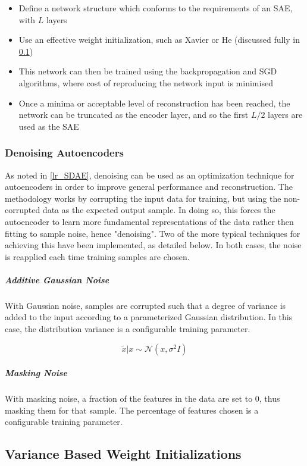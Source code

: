 \documentclass[a4paper,11pt,oneside]{article}
\theoremstyle{plain}
\theoremstyle{definition}
\begin{document}
\begin{itemize}
	\item [1] Define a network structure which conforms to the requirements of an SAE, with $L$ layers
	\item [2] Use an effective weight initialization, such as Xavier or He (discussed fully in \ref{imp_weights})
	\item [3] This network can then be trained using the backpropagation and SGD algorithms, where cost of reproducing the network input is minimised
	\item [4] Once a minima or acceptable level of reconstruction has been reached, the network can be truncated as the encoder layer, and so the first $L/2$ layers are used as the SAE
\end{itemize}

\subsubsection{Denoising Autoencoders}

As noted in \ref{lr_SDAE}, denoising can be used as an optimization technique for autoencoders in order to improve general performance and reconstruction. The methodology works by corrupting the input data for training, but using the non-corrupted data as the expected output sample. In doing so, this forces the autoencoder to learn more fundamental representations of the data rather then fitting to sample noise, hence "denoising". Two of the more typical techniques for achieving this have been implemented, as detailed below. In both cases, the noise is reapplied each time training samples are chosen.

\subparagraph{Additive Gaussian Noise}

With Gaussian noise, samples are corrupted such that a degree of variance is added to the input according to a parameterized Gaussian distribution. In this case, the distribution variance is a configurable training parameter.

\begin{equation}
\tilde{{x}} | {x} \sim \mathcal{N}\left({x}, \sigma^{2} I\right)
\end{equation}

\subparagraph{Masking Noise}

With masking noise, a fraction of the features in the data are set to 0, thus masking them for that sample. The percentage of features chosen is a configurable training parameter.

\subsection{Variance Based Weight Initializations}\label{imp_weights}
\end{document}
